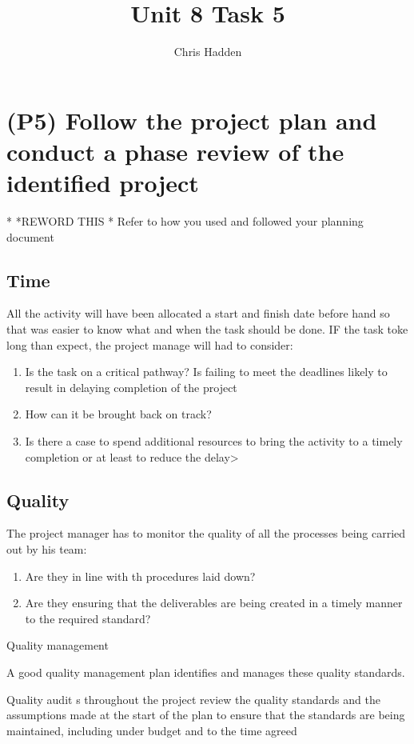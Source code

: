 \documentclass{article}
\begin{document}
\title{Unit 8 Task 5}
\author{Chris Hadden}
\date{}
\maketitle

\section{(P5) Follow the project plan and conduct a phase review of the identified project}
*
*REWORD THIS
*
Refer to how you used and followed your planning document
\subsection{Time}
All the activity will have been allocated a start and finish date before hand so that was easier to know what and when the task should be done. IF the task toke long than expect, the project manage will had to consider:
\begin{enumerate}
	\item Is  the task on a critical pathway? Is failing to meet the deadlines likely to result in delaying completion of the project
	\item How can it be brought back on track?
	\item Is there a case to spend additional resources to bring the activity to a timely completion or at least to reduce the delay>
\end{enumerate}

\subsection{Quality}
 The project manager has to monitor the quality of all the processes being carried out by his team:
 \begin{enumerate}
 	\item Are they in line with th procedures laid down?
	\item Are they ensuring that the deliverables are being created in a timely manner to the required standard?
\end{enumerate}

Quality management

A good quality management plan identifies and manages these quality standards.

Quality audit s throughout the project review the quality standards and the assumptions made at the start of the plan to ensure that the standards are being maintained, including under budget and to the time agreed
\end{document}
